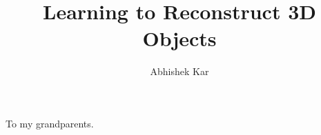 \documentclass[12pt, oneside]{lib/ucthesis}
\begin{document}

\title{Learning to Reconstruct 3D Objects}
\author{Abhishek Kar}

\prevdegrees{} %


	


\begin{frontmatter} 
\maketitle
\approvalpage
\copyrightpage
\abstract
	
	\abstractsignature
\endabstract

\end{frontmatter}
\begin{optionalFrontMatter}
\begin{dedication}
	\vspace*{\fill} 
	To my grandparents.
	\vspace*{\fill} 
\end{dedication}
\end{optionalFrontMatter}
\end{document}
